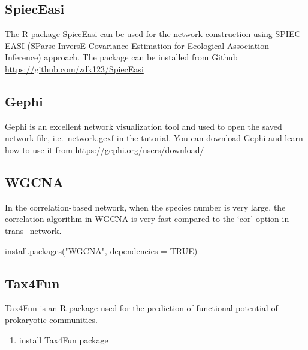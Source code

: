 \documentclass[
]{book}
\newenvironment{Shaded}{\begin{snugshade}}{\end{snugshade}}
\newcommand{\AttributeTok}[1]{\textcolor[rgb]{0.77,0.63,0.00}{#1}}
\newcommand{\ConstantTok}[1]{\textcolor[rgb]{0.00,0.00,0.00}{#1}}
\newcommand{\FunctionTok}[1]{\textcolor[rgb]{0.00,0.00,0.00}{#1}}
\newcommand{\NormalTok}[1]{#1}
\newcommand{\StringTok}[1]{\textcolor[rgb]{0.31,0.60,0.02}{#1}}
\providecommand{\tightlist}{%
  \setlength{\itemsep}{0pt}\setlength{\parskip}{0pt}}
\begin{document}
\hypertarget{spieceasi}{%
\subsection{SpiecEasi}\label{spieceasi}}

The R package SpiecEasi can be used for the network construction using SPIEC-EASI (SParse InversE Covariance Estimation for Ecological Association Inference) approach.
The package can be installed from Github \url{https://github.com/zdk123/SpiecEasi}

\hypertarget{gephi}{%
\subsection{Gephi}\label{gephi}}

Gephi is an excellent network visualization tool and used to open the saved network file,
i.e.~network.gexf in the \href{https://chiliubio.github.io/microeco_tutorial/model-based-class.html\#trans_network-class}{tutorial}.
You can download Gephi and learn how to use it from \url{https://gephi.org/users/download/}

\hypertarget{wgcna}{%
\subsection{WGCNA}\label{wgcna}}

In the correlation-based network, when the species number is very large,
the correlation algorithm in WGCNA is very fast compared to the `cor' option in trans\_network.

\begin{Shaded}
\begin{Highlighting}[]
\FunctionTok{install.packages}\NormalTok{(}\StringTok{"WGCNA"}\NormalTok{, }\AttributeTok{dependencies =} \ConstantTok{TRUE}\NormalTok{)}
\end{Highlighting}
\end{Shaded}

\hypertarget{tax4fun}{%
\subsection{Tax4Fun}\label{tax4fun}}

Tax4Fun is an R package used for the prediction of functional potential of prokaryotic communities.

\begin{enumerate}
\def\labelenumi{\arabic{enumi}.}
\tightlist
\item
  install Tax4Fun package
\end{enumerate}
\end{document}
